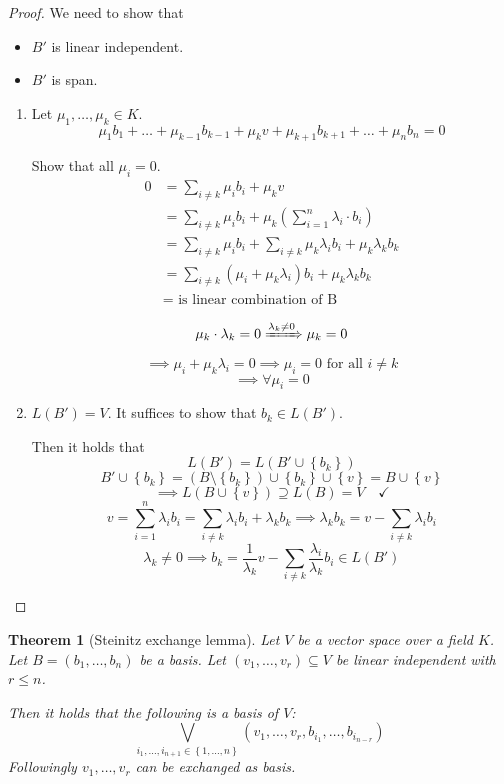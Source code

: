\documentclass[a4paper,landscape,twocolumn]{article}
\newcommand\set[1]{\left\{#1\right\}}
\newtheorem{theorem}{Theorem}[section]
\begin{document}
\begin{proof}
  We need to show that
  \begin{itemize}
    \item $B'$ is linear independent.
    \item $B'$ is span.
  \end{itemize}

  \begin{enumerate}
    \item
      Let $\mu_1, \dots, \mu_k \in K$.
      \[ \mu_1 b_1 + \ldots + \mu_{k-1} b_{k-1} + \mu_k v + \mu_{k+1} b_{k+1} + \dots + \mu_n b_n = 0 \]

      Show that all $\mu_i = 0$.
      \begin{align*}
        0 &= \sum_{i \neq k} \mu_i b_i + \mu_k v \\
          &= \sum_{i \neq k} \mu_i b_i + \mu_k \left(\sum_{i=1}^n \lambda_i \cdot b_i\right) \\
          &= \sum_{i \neq k} \mu_i b_i + \sum_{i \neq k} \mu_k \lambda_i b_i + \mu_k \lambda_k b_k \\
          &= \sum_{i \neq k} (\mu_i + \mu_k \lambda_i) b_i + \mu_k \lambda_k b_k \\
          &= \text{ is linear combination of B}
      \end{align*}

      \[ \mu_k \cdot \lambda_k = 0 \xRightarrow{\lambda_k \neq 0} \mu_k = 0 \]
      \[ \implies \mu_i + \mu_k \lambda_i = 0 \implies \mu_i = 0 \text{ for all } i \neq k \]
      \[ \implies \forall \mu_i = 0 \]
    \item $L(B') = V$.
      It suffices to show that $b_k \in L(B')$.

      Then it holds that
      \[ L(B') = L(B' \cup \set{b_k}) \]
      \[ B' \cup \set{b_k} = (B \setminus \set{b_k}) \cup \set{b_k} \cup \set{v} = B \cup \set{v} \]
      \[ \implies L(B \cup \set{v}) \supseteq L(B) = V \quad\checkmark \]
      \[ v = \sum_{i=1}^n \lambda_i b_i = \sum_{i \neq k} \lambda_i b_i + \lambda_k b_k  \implies \lambda_k b_k = v - \sum_{i \neq k} \lambda_i b_i \]
      \[ \lambda_k \neq 0 \implies b_k = \frac{1}{\lambda_k} v - \sum_{i \neq k} \frac{\lambda_i}{\lambda_k} b_i \in L(B') \]
  \end{enumerate}
\end{proof}

\begin{theorem}[Steinitz exchange lemma]
  \label{steinitz-lemma}
  Let $V$ be a vector space over a field $K$.
  Let $B = (b_1, \ldots, b_n)$ be a basis.
  Let $(v_1, \dots, v_r) \subseteq V$ be linear independent with $r \leq n$.

  Then it holds that the following is a basis of $V$:
  \[ \bigvee_{i_1, \dots, i_{n+1} \in \set{1, \dots, n}} (v_1, \dots, v_r, b_{i_1}, \dots, b_{i_{n-r}}) \]
  Followingly $v_1, \dots, v_r$ can be exchanged as basis.
\end{theorem}
\end{document}
